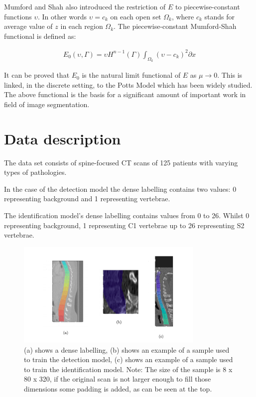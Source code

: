 Mumford and Shah also introduced the restriction of $E$ to piecewise-constant functions $\upsilon$. In other words $\upsilon = c_k$ on each open set $\Omega_k$, where $c_k$ stands for average value of $z$ in each region $\Omega_k$. The piecewise-constant Mumford-Shah functional is defined as:

\begin{align*}
 E_0 (\upsilon, \Gamma) = \upsilon H^{n-1} (\Gamma) \int_{\Omega_k} (\upsilon - c_k)^2 \partial x
\end{align*}

It can be proved that $E_0$ is the natural limit functional of $E$ as $\mu \to 0$. This is linked, in the discrete setting, to the \cite{Wu1982} Potts Model which has been widely studied. The above functional is the basis for a significant amount of important work in field of image segmentation.

\section{Data description}
The data set consists of spine-focused CT scans of 125 patients with varying types of pathologies. 

In the case of the detection model the dense labelling contains two values: 0 representing background and 1 representing vertebrae. 

The identification model’s dense labelling contains values from 0 to 26. Whilst 0 representing background, 1 representing C1 vertebrae up to 26 representing S2 vertebrae.

\begin{figure}[h]
    \centering \includegraphics[width=9cm]{images/labeled_data.png}
    \caption {(a) shows a dense labelling, (b) shows an example of a sample used to train the detection model, (c) shows an example of a sample used to train the identification model. Note: The size of the sample is 8 x 80 x 320, if the original scan is not larger enough to fill those dimensions some padding is added, as can be seen at the top.}
    \label{fig:labeled_data}
\end{figure}
